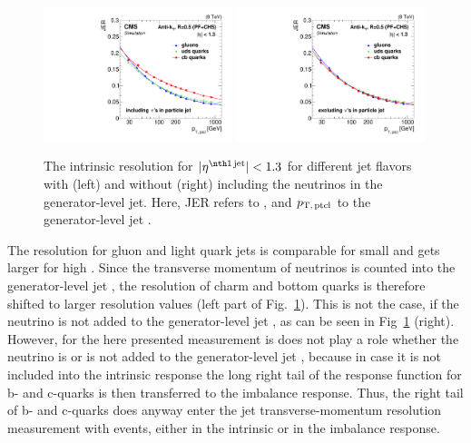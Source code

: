 \begin{figure}[b]
  \centering
      \includegraphics[width=0.49\textwidth]{figures/resolution/systematicUncertainties/Resolution_for_1_eta_bin_FlavorUncertainty_RMS99_wNeutrinos.pdf}
      \includegraphics[width=0.49\textwidth]{figures/resolution/systematicUncertainties/Resolution_for_1_eta_bin_FlavorUncertainty_RMS99.pdf}
  \caption{The intrinsic resolution \jerintr for $|\etafirstjet| < 1.3$ for different jet flavors with (left) and without (right) including the neutrinos in the generator-level jet.
           Here, JER refers to \jerintr, and $p_{\text{T,\,ptcl}}$ to the generator-level jet \pt. }  
  \label{res:fig:ResolutionDifferences}
\end{figure}
The resolution for gluon and light quark jets is comparable for small \ptgamma and gets larger for high \ptgamma.
Since the transverse momentum of neutrinos is counted into the generator-level jet \pt, the resolution of charm and bottom quarks is therefore shifted to larger resolution values (left part of Fig.~\ref{res:fig:ResolutionDifferences}).
This is not the case, if the neutrino \pt is not added to the generator-level jet \pt, as can be seen in Fig~\ref{res:fig:ResolutionDifferences} (right).
However, for the here presented measurement is does not play a role whether the neutrino \pt is or is not added to the generator-level jet \pt, because in case it is not included into the intrinsic response the long right tail of the response function for b- and c-quarks is then transferred to the imbalance response.
Thus, the right tail of b- and c-quarks does anyway enter the jet transverse-momentum resolution measurement with \GAMJET events, either in the intrinsic or in the imbalance response.

